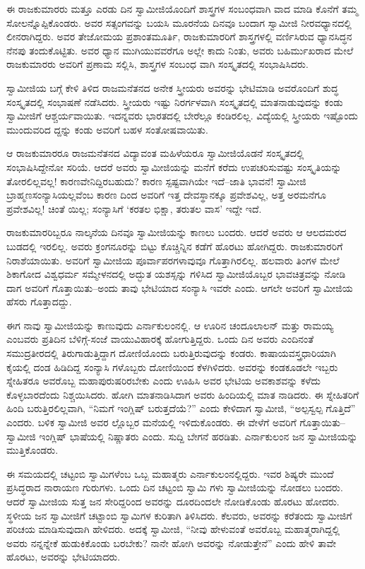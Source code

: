 ಈ ರಾಜಕುಮಾರರು ಮತ್ತೂ ಎರಡು ದಿನ ಸ್ವಾಮೀಜಿಯೊಂದಿಗೆ ಶಾಸ್ತ್ರಗಳ ಸಂಬಂಧವಾಗಿ ವಾದ ಮಾಡಿ ಕೊನೆಗೆ ತಮ್ಮ ಸೋಲನ್ನೊಪ್ಪಿಕೊಂಡರು. ಅವರ ಸತ್ಸಂಗವನ್ನು ಬಯಸಿ ಮೂರನೆಯ ದಿನವೂ ಬಂದಾಗ ಸ್ವಾಮೀಜಿ ನೀರವಧ್ಯಾನದಲ್ಲಿ ಲೀನರಾಗಿದ್ದರು. ಅವರ ತೇಜೋಮಯ ಪ್ರಶಾಂತಮೂರ್ತಿ, ರಾಜಕುಮಾರರಿಗೆ ಶಾಸ್ತ್ರಗಳಲ್ಲಿ ವರ್ಣಿಸಿರುವ ಧ್ಯಾನಸಿದ್ಧನ ನೆನಪು ತಂದುಕೊಟ್ಟಿತು. ಅವರ ಧ್ಯಾನ ಮುಗಿಯುವವರೆಗೂ ಅಲ್ಲೇ ಕಾದು ನಿಂತು, ಅವರು ಬಹಿರ್ಮುಖರಾದ ಮೇಲೆ ರಾಜಕುಮಾರರು ಅವರಿಗೆ ಪ್ರಣಾಮ ಸಲ್ಲಿಸಿ, ಶಾಸ್ತ್ರಗಳ ಸಂಬಂಧ ವಾಗಿ ಸಂಸ್ಕೃತದಲ್ಲಿ ಸಂಭಾಷಿಸಿದರು.

ಸ್ವಾಮೀಜಿಯ ಬಗ್ಗೆ ಕೇಳಿ ತಿಳಿದ ರಾಜಮನೆತನದ ಅನೇಕ ಸ್ತ್ರೀಯರು ಅವರನ್ನು ಭೇಟಿಮಾಡಿ ಅವರೊಂದಿಗೆ ಶುದ್ಧ ಸಂಸ್ಕೃತದಲ್ಲಿ ಸಂಭಾಷಣೆ ನಡೆಸಿದರು. ಸ್ತ್ರೀಯರು ಇಷ್ಟು ನಿರರ್ಗಳವಾಗಿ ಸಂಸ್ಕೃತದಲ್ಲಿ ಮಾತನಾಡುವುದನ್ನು ಕಂಡು ಸ್ವಾಮೀಜಿಗೆ ಆಶ್ಚರ್ಯವಾಯಿತು. ಇದನ್ನವರು ಭಾರತದಲ್ಲಿ ಬೇರೆಲ್ಲೂ ಕಂಡಿರಲಿಲ್ಲ. ವಿದ್ಯೆಯಲ್ಲಿ ಸ್ತ್ರೀಯರು ಇಷ್ಟೊಂದು ಮುಂದುವರಿದ ದ್ದನ್ನು ಕಂಡು ಅವರಿಗೆ ಬಹಳ ಸಂತೋಷವಾಯಿತು.

ಆ ರಾಜಕುಮಾರರೂ ರಾಜಮನೆತನದ ವಿದ್ಯಾವಂತ ಮಹಿಳೆಯರೂ ಸ್ವಾಮೀಜಿಯೊಡನೆ ಸಂಸ್ಕೃತದಲ್ಲಿ ಸಂಭಾಷಿಸಿದ್ದೇನೋ ಸರಿಯೆ. ಆದರೆ ಅವರು ಸ್ವಾಮೀಜಿಯನ್ನು ಮನೆಗೆ ಕರೆದು ಉಪಚರಿಸುವಷ್ಟು ಸಂಸ್ಕೃತಿಯನ್ನು ತೋರಲಿಲ್ಲವಲ್ಲ! ಕಾರಣವೇನಿದ್ದಿರಬಹುದು? ಕಾರಣ ಸ್ಪಷ್ಟವಾಗಿಯೇ ಇದೆ–ಜಾತಿ ಭಾವನೆ! ಸ್ವಾಮೀಜಿ ಬ್ರಾಹ್ಮಣಸಂನ್ಯಾಸಿಯಲ್ಲವೆಂಬ ಕಾರಣ ದಿಂದ ಅವರಿಗೆ ಇತ್ತ ದೇವಸ್ಥಾನಕ್ಕೂ ಪ್ರವೇಶವಿಲ್ಲ, ಅತ್ತ ಅರಮನೆಗೂ ಪ್ರವೇಶವಿಲ್ಲ! ಚಿಂತೆ ಯಿಲ್ಲ; ಸಂನ್ಯಾಸಿಗೆ ‘ಕರತಲ ಭಿಕ್ಷಾ, ತರುತಲ ವಾಸ’ ಇದ್ದೇ ಇದೆ.

ರಾಜಕುಮಾರರಿಬ್ಬರೂ ನಾಲ್ಕನೆಯ ದಿನವೂ ಸ್ವಾಮೀಜಿಯನ್ನು ಕಾಣಲು ಬಂದರು. ಆದರೆ ಅವರು ಆ ಆಲದಮರದ ಬುಡದಲ್ಲಿ ಇರಲಿಲ್ಲ. ಅವರು ಕ್ರಂಗನೂರನ್ನು ಬಿಟ್ಟು ಕೊಚ್ಚಿನ್ನಿನ ಕಡೆಗೆ ಹೊರಟು ಹೋಗಿದ್ದರು. ರಾಜಕುಮಾರರಿಗೆ ನಿರಾಶೆಯಾಯಿತು. ಅವರಿಗೆ ಸ್ವಾಮೀಜಿಯ ಪೂರ್ವಾಪರಗಳಾವುವೂ ಗೊತ್ತಾಗಿರಲಿಲ್ಲ. ಹಲವಾರು ತಿಂಗಳ ಮೇಲೆ ಶಿಕಾಗೋದ ವಿಶ್ವಧರ್ಮ ಸಮ್ಮೇಳನದಲ್ಲಿ ಅದ್ಭುತ ಯಶಸ್ಸನ್ನು ಗಳಿಸಿದ ಸ್ವಾಮೀಜಿಯೊಬ್ಬರ ಭಾವಚಿತ್ರವನ್ನು ನೋಡಿ ದಾಗ ಅವರಿಗೆ ಗೊತ್ತಾಯಿತು–ಅಂದು ತಾವು ಭೇಟಿಯಾದ ಸಂನ್ಯಾಸಿ ಇವರೇ ಎಂದು. ಆಗಲೇ ಅವರಿಗೆ ಸ್ವಾಮೀಜಿಯ ಹೆಸರು ಗೊತ್ತಾದದ್ದು.

ಈಗ ನಾವು ಸ್ವಾಮೀಜಿಯನ್ನು ಕಾಣುವುದು ಎರ್ನಾಕುಲಂನಲ್ಲಿ. ಆ ಊರಿನ ಚಂದೂಲಾಲನ್ ಮತ್ತು ರಾಮಯ್ಯ ಎಂಬವರು ಪ್ರತಿದಿನ ಬೆಳಿಗ್ಗೆ-ಸಂಜೆ ವಾಯುವಿಹಾರಕ್ಕೆ ಹೋಗುತ್ತಿದ್ದರು. ಒಂದು ದಿನ ಅವರು ಎಂದಿನಂತೆ ಸಮುದ್ರತೀರದಲ್ಲಿ ತಿರುಗಾಡುತ್ತಿದ್ದಾಗ ದೋಣಿಯೊಂದು ಬರುತ್ತಿರುವುದನ್ನು ಕಂಡರು. ಕಾಷಾಯವಸ್ತ್ರಧಾರಿಯಾಗಿ ಕೈಯಲ್ಲಿ ದಂಡ ಹಿಡಿದಿದ್ದ ಸಂನ್ಯಾಸಿ ಗಳೊಬ್ಬರು ದೋಣಿಯಿಂದ ಕೆಳಗಿಳಿದರು. ಅವರನ್ನು ಕಂಡಕೂಡಲೇ ಇಬ್ಬರು ಸ್ನೇಹಿತರೂ ಅವರೊಬ್ಬ ಮಹಾಪುರುಷರಿರಬೇಕು ಎಂದು ಊಹಿಸಿ ಅವರ ಭೇಟಿಯ ಅವಕಾಶವನ್ನು ಕಳೆದು ಕೊಳ್ಳಬಾರದೆಂದು ನಿಶ್ಚಯಿಸಿದರು. ಹೋಗಿ ಮಾತನಾಡಿಸಿದಾಗ ಅವರು ಹಿಂದಿಯಲ್ಲಿ ಮಾತ ನಾಡಿದರು. ಈ ಸ್ನೇಹಿತರಿಗೆ ಹಿಂದಿ ಬರುತ್ತಿರಲಿಲ್ಲವಾಗಿ, “ನಿಮಗೆ ಇಂಗ್ಲಿಷ್ ಬರುತ್ತದೆಯೆ?” ಎಂದು ಕೇಳಿದಾಗ ಸ್ವಾಮೀಜಿ, “ಅಲ್ಪಸ್ವಲ್ಪ ಗೊತ್ತಿದೆ” ಎಂದರು. ಬಳಿಕ ಸ್ವಾಮೀಜಿ ಅವರ ಲ್ಲೊಬ್ಬರ ಮನೆಯಲ್ಲಿ ಇಳಿದುಕೊಂಡರು. ಈ ವೇಳೆಗೆ ಅವರಿಗೆ ಗೊತ್ತಾಯಿತು–ಸ್ವಾಮೀಜಿ ಇಂಗ್ಲಿಷ್ ಭಾಷೆಯಲ್ಲಿ ನಿಷ್ಣಾತರು ಎಂದು. ಸುದ್ದಿ ಬೇಗನೆ ಹರಡಿತು. ಎರ್ನಾಕುಲಂನ ಜನ ಸ್ವಾಮೀಜಿಯನ್ನು ಮುತ್ತಿಕೊಂಡರು.

ಈ ಸಮಯದಲ್ಲಿ ಚಟ್ಟಂಬಿ ಸ್ವಾಮಿಗಳೆಂಬ ಒಬ್ಬ ಮಹಾತ್ಮರು ಎರ್ನಾಕುಲಂನಲ್ಲಿದ್ದರು. ಇವರ ಶಿಷ್ಯರೇ ಮುಂದೆ ಪ್ರಸಿದ್ಧರಾದ ನಾರಾಯಣ ಗುರುಗಳು. ಒಂದು ದಿನ ಚಟ್ಟಂಬಿ ಸ್ವಾಮಿ ಗಳು ಸ್ವಾಮೀಜಿಯನ್ನು ನೋಡಲು ಬಂದರು. ಆದರೆ ಸ್ವಾಮೀಜಿಯ ಸುತ್ತ ಜನ ಸೇರಿದ್ದರಿಂದ ಅವರನ್ನು ದೂರದಿಂದಲೇ ನೋಡಿಕೊಂಡು ಹೊರಟು ಹೋದರು. ಸ್ಥಳೀಯ ಜನ ಸ್ವಾಮೀಜಿಗೆ ಚಟ್ಟಾಂಬಿ ಸ್ವಾಮಿಗಳ ಕುರಿತಾಗಿ ತಿಳಿಸಿದರು. ಕೆಲವರು, ಅವರನ್ನು ಕರೆತಂದು ಸ್ವಾಮೀಜಿಗೆ ಪರಿಚಯ ಮಾಡಿಸುವುದಾಗಿ ಹೇಳಿದರು. ಅದಕ್ಕೆ ಸ್ವಾಮೀಜಿ, “ನೀವು ಹೇಳುವಂತೆ ಅವರೊಬ್ಬ ಮಹಾತ್ಮರಾಗಿದ್ದಲ್ಲಿ ಅವರು ನನ್ನನ್ನೇಕೆ ಹುಡುಕಿಕೊಂಡು ಬರಬೇಕು? ನಾನೇ ಹೋಗಿ ಅವರನ್ನು ನೋಡುತ್ತೇನೆ” ಎಂದು ಹೇಳಿ ತಾವೇ ಹೊರಟು, ಅವರನ್ನು ಭೇಟಿಯಾದರು.

